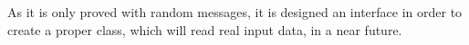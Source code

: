 
As it is only proved with random messages, it is designed an interface in order to create a proper class, which will read real input data, in a near future.
